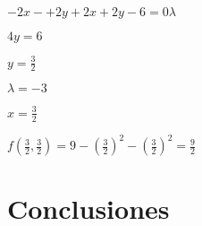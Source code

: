 $-2x-+2y+2x+2y-6 = 0 \lambda$ \vspace{2mm}

$4y = 6 $ \vspace{2mm}

$y = \frac{3}{2} $ \vspace{2mm}

$\lambda = -3$ \vspace{2mm}

$x = \frac{3}{2}$ \vspace{2mm}

$f(\frac{3}{2},\frac{3}{2}) = 9-(\frac{3}{2})^2-(\frac{3}{2})^2 = \frac{9}{2}$






\section{Conclusiones}\label{ejemplos}


